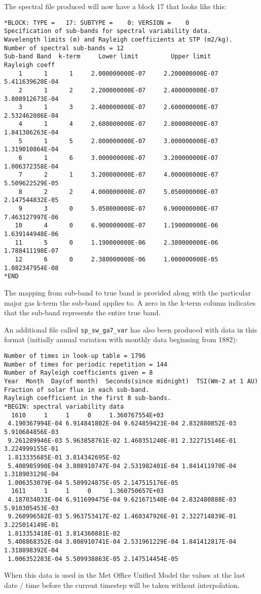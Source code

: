 \noindent The spectral file produced will now have a block 17 that looks like this:

{\small
\begin{verbatim}
*BLOCK: TYPE =   17: SUBTYPE =    0: VERSION =    0
Specification of sub-bands for spectral variability data.
Wavelength limits (m) and Rayleigh coefficients at STP (m2/kg).
Number of spectral sub-bands = 12
Sub-band Band  k-term     Lower limit         Upper limit       Rayleigh coeff
    1      1      1     2.000000000E-07     2.200000000E-07     5.411639620E-04
    2      1      2     2.200000000E-07     2.400000000E-07     3.808912673E-04
    3      1      3     2.400000000E-07     2.600000000E-07     2.532462086E-04
    4      1      4     2.600000000E-07     2.800000000E-07     1.841386263E-04
    5      1      5     2.800000000E-07     3.000000000E-07     1.319010864E-04
    6      1      6     3.000000000E-07     3.200000000E-07     1.006372358E-04
    7      2      1     3.200000000E-07     4.000000000E-07     5.509622529E-05
    8      2      2     4.000000000E-07     5.050000000E-07     2.147544832E-05
    9      3      0     5.050000000E-07     6.900000000E-07     7.463127997E-06
   10      4      0     6.900000000E-07     1.190000000E-06     1.639144948E-06
   11      5      0     1.190000000E-06     2.380000000E-06     1.788411198E-07
   12      6      0     2.380000000E-06     1.000000000E-05     1.082347954E-08
*END
\end{verbatim}
}

\noindent The mapping from sub-band to true band is provided along with the particular major gas k-term the sub-band applies to. A zero in the k-term column indicates that the sub-band represents the entire true band. 

An additional file called {\tt sp\_sw\_ga7\_var} has also been produced with data in this format (initially annual variation with monthly data beginning from 1882):

{\small
\begin{verbatim}
Number of times in look-up table = 1796
Number of times for periodic repetition = 144
Number of Rayleigh coefficients given = 8
Year  Month  Day(of month)  Seconds(since midnight)  TSI(Wm-2 at 1 AU)
Fraction of solar flux in each sub-band.
Rayleigh coefficient in the first 8 sub-bands.
*BEGIN: spectral variability data
  1610     1     1     0     1.360767554E+03
 4.190367994E-04 6.914841802E-04 9.624859423E-04 2.832880852E-03 5.910684856E-03
 9.261289946E-03 5.963858761E-02 1.460351240E-01 2.322715146E-01 3.224999155E-01
 1.813335685E-01 3.814342695E-02
 5.408985990E-04 3.808910747E-04 2.531982401E-04 1.841411970E-04 1.318903129E-04
 1.006353079E-04 5.509924875E-05 2.147515176E-05
  1611     1     1     0     1.360750657E+03
 4.187034033E-04 6.911699475E-04 9.621671540E-04 2.832480888E-03 5.910305453E-03
 9.260996582E-03 5.963753417E-02 1.460347926E-01 2.322714839E-01 3.225014149E-01
 1.813353418E-01 3.814360881E-02
 5.408868352E-04 3.808910741E-04 2.531961229E-04 1.841412817E-04 1.318898392E-04
 1.006352283E-04 5.509938863E-05 2.147514454E-05
\end{verbatim}
}

\noindent When this data is used in the Met Office Unified Model the values at the last date / time before the current timestep will be taken without interpolation.
